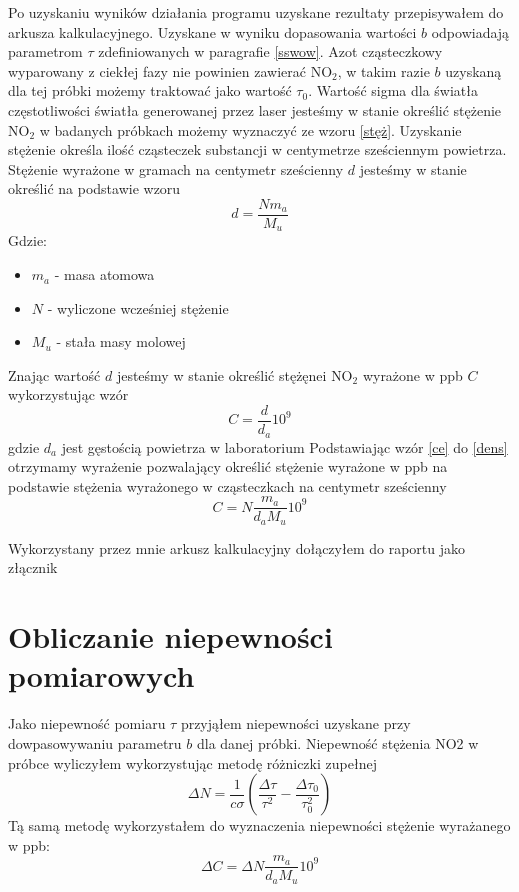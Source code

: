 \documentclass[10pt,a4paper]{article}
\begin{document}
Po uzyskaniu wyników działania programu uzyskane rezultaty przepisywałem do arkusza kalkulacyjnego. Uzyskane w wyniku dopasowania wartości $b$ odpowiadają parametrom $\tau$ zdefiniowanych w paragrafie \ref{sswow}. Azot cząsteczkowy wyparowany z ciekłej fazy nie powinien zawierać $\text{NO}_{\text{2}}$, w takim razie $b$ uzyskaną dla tej próbki możemy traktować jako wartość $\tau_0$. Wartość sigma dla światła częstotliwości  światła generowanej przez laser jesteśmy w stanie określić stężenie $\text{NO}_{\text{2}}$ w badanych próbkach możemy wyznaczyć ze wzoru \ref{stęż}.  Uzyskanie stężenie określa ilość cząsteczek substancji w centymetrze sześciennym powietrza.  
Stężenie wyrażone w gramach na centymetr sześcienny $d$ jesteśmy w stanie określić na podstawie wzoru
\begin{equation}
    \label{dens}
    d = \frac{N m_a}{M_u}
\end{equation}
Gdzie:
\begin{itemize}
    \item $m_a$ - masa atomowa
    \item $N$ - wyliczone wcześniej stężenie
    \item $M_u$ - stała masy molowej
\end{itemize}
 Znając wartość $d$ jesteśmy w stanie określić stężęnei $\text{NO}_{\text{2}}$ wyrażone w ppb $C$ wykorzystując wzór
\begin{equation}
    \label{ce}
    C=\frac{d}{d_a} 10^9
\end{equation}
gdzie $d_a$ jest gęstością powietrza w laboratorium
Podstawiając wzór \ref{ce} do \ref{dens} otrzymamy wyrażenie pozwalający określić stężenie wyrażone w ppb na podstawie stężenia wyrażonego w cząsteczkach na centymetr sześcienny
\begin{equation}
    \label{cer}
    C = N \frac{m_a}{d_a M_u}10^9
\end{equation}

Wykorzystany przez mnie arkusz kalkulacyjny dołączyłem do raportu jako złącznik


\section{Obliczanie niepewności pomiarowych}

Jako niepewność pomiaru $\tau$ przyjąłem niepewności uzyskane przy dowpasowywaniu parametru $b$ dla danej próbki. Niepewność stężenia NO2 w próbce wyliczyłem wykorzystując metodę różniczki zupełnej
\begin{equation}
    \label{niept}
    \Delta N = \frac{1}{c \sigma} \left(\frac{\Delta \tau}{\tau^2} - \frac{\Delta \tau_0}{\tau_0^2} \right)
\end{equation}
Tą samą metodę wykorzystałem do wyznaczenia niepewności stężenie wyrażanego w ppb:
\begin{equation}
    \label{niepn}
    \Delta C = \Delta N \frac{m_a}{d_a M_u}10^9
\end{equation}
\end{document}
